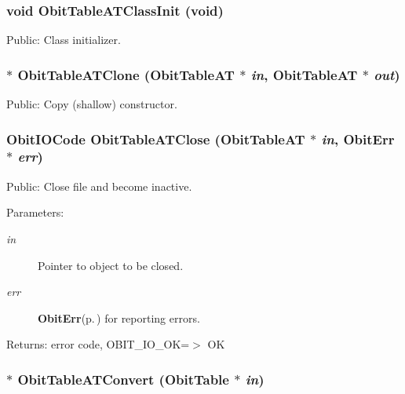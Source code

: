 \subsubsection{\setlength{\rightskip}{0pt plus 5cm}void Obit\-Table\-ATClass\-Init (void)}\label{ObitTableAT_8h_a10}


Public: Class initializer. 

\subsubsection{$\ast$ Obit\-Table\-ATClone ({\bf Obit\-Table\-AT} $\ast$ {\em in}, {\bf Obit\-Table\-AT} $\ast$ {\em out})}\label{ObitTableAT_8h_a15}


Public: Copy (shallow) constructor. 

\subsubsection{\setlength{\rightskip}{0pt plus 5cm}Obit\-IOCode Obit\-Table\-ATClose ({\bf Obit\-Table\-AT} $\ast$ {\em in}, {\bf Obit\-Err} $\ast$ {\em err})}\label{ObitTableAT_8h_a21}


Public: Close file and become inactive. 

\begin{Desc}
\item[Parameters:]
\begin{description}
\item[{\em in}]Pointer to object to be closed. \item[{\em err}]{\bf Obit\-Err}{\rm (p.\,\pageref{structObitErr})} for reporting errors. \end{description}
\end{Desc}
\begin{Desc}
\item[Returns:]error code, OBIT\_\-IO\_\-OK=$>$ OK \end{Desc}
\subsubsection{$\ast$ Obit\-Table\-ATConvert ({\bf Obit\-Table} $\ast$ {\em in})}\label{ObitTableAT_8h_a16}


